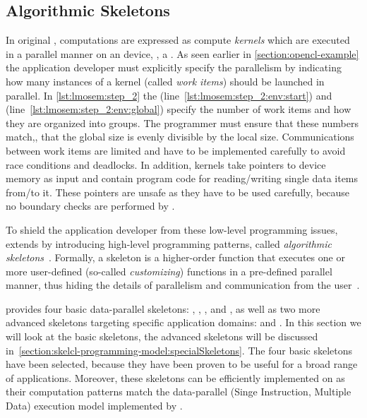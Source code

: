 \subsection{Algorithmic Skeletons}
\label{section:skelcl-programming-model:skeletons}
In original \OpenCL, computations are expressed as compute \emph{kernels} which are executed in a parallel manner on an \OpenCL device, \eg, a \GPU.
As seen earlier in \autoref{section:opencl-example} the application developer must explicitly specify the parallelism by indicating how many instances of a kernel (called \emph{work items}) should be launched in parallel.
In \autoref{lst:lmosem:step_2} the  (line~\ref{lst:lmosem:step_2:env:start}) and  (line~\ref{lst:lmosem:step_2:env:global}) specify the number of work items and how they are organized into groups.
The programmer must ensure that these numbers match,\ie, that the global size is evenly divisible by the local size.
Communications between work items are limited and have to be implemented carefully to avoid race conditions and deadlocks.
In addition, kernels take pointers to device memory as input and contain program code for reading/writing single data items from/to it.
These pointers are unsafe as they have to be used carefully, because no boundary checks are performed by \OpenCL.

To shield the application developer from these low-level programming issues, \SkelCL extends \OpenCL by introducing high-level programming patterns, called \emph{algorithmic skeletons}~\cite{Cole1991}.
Formally, a skeleton is a higher-order function that executes one or more user-defined (so-called \emph{customizing}) functions in a pre-defined parallel manner, thus hiding the details of parallelism and communication from the user~\cite{GorlatchCo2011}.

\SkelCL provides four basic data-parallel skeletons: \map, \zip, \reduce, and \scan,
as well as two more advanced skeletons targeting specific application domains: \stencil and \allpairs.
In this section we will look at the basic skeletons, the advanced skeletons will be discussed in~\autoref{section:skelcl-programming-model:specialSkeletons}.
The four basic skeletons have been selected, because they have been proven to be useful for a broad range of applications.
Moreover, these skeletons can be efficiently implemented on \GPUs as their computation patterns match the data-parallel \SIMD (Singe Instruction, Multiple Data) execution model implemented by \GPUs.


